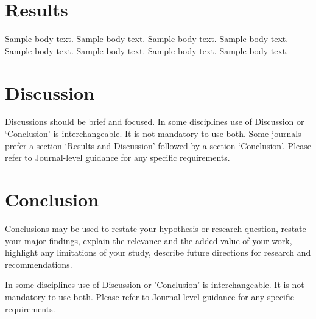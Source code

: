 \documentclass[sn-mathphys-num]{sn-jnl}
\begin{document}




\section{Results}\label{sec2}

Sample body text. Sample body text. Sample body text. Sample body text. Sample body text. Sample body text. Sample body text. Sample body text.

\section{Discussion}\label{sec12}

Discussions should be brief and focused. In some disciplines use of Discussion or `Conclusion' is interchangeable. It is not mandatory to use both. Some journals prefer a section `Results and Discussion' followed by a section `Conclusion'. Please refer to Journal-level guidance for any specific requirements. 

\section{Conclusion}\label{sec13}

Conclusions may be used to restate your hypothesis or research question, restate your major findings, explain the relevance and the added value of your work, highlight any limitations of your study, describe future directions for research and recommendations. 

In some disciplines use of Discussion or 'Conclusion' is interchangeable. It is not mandatory to use both. Please refer to Journal-level guidance for any specific requirements. 
\end{document}
